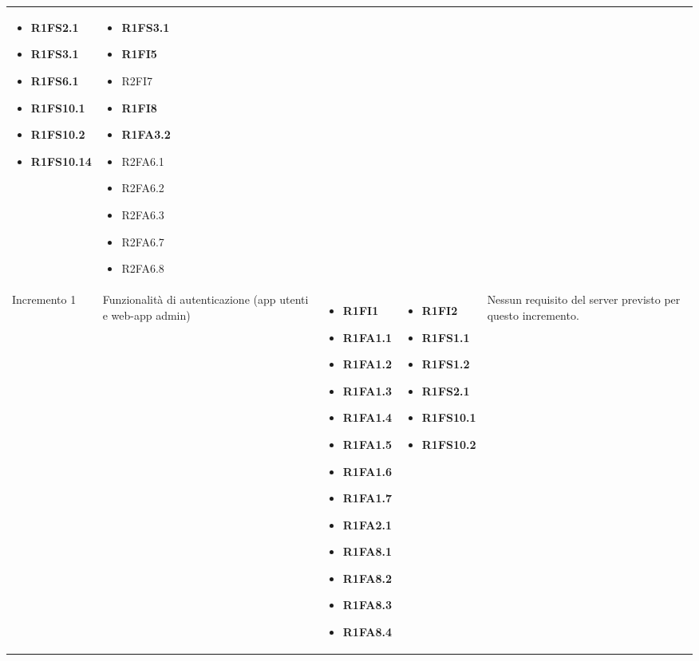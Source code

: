 {\begin{longtable}{C{2.5cm} C{3.2cm} C{2.8cm} C{2.8cm} C{2.8cm}}
\begin{itemize}
    \item[ ] \textbf{R1FS2.1}
    \item[ ] \textbf{R1FS3.1}
    \item[ ] \textbf{R1FS6.1}
    \item[ ] \textbf{R1FS10.1}
    \item[ ] \textbf{R1FS10.2} 
    \item[ ] \textbf{R1FS10.14}
\end{itemize} & \begin{itemize} 
    \item[ ] \textbf{R1FS3.1}
    \item[ ] \textbf{R1FI5}
    \item[ ] R2FI7
    \item[ ] \textbf{R1FI8}
    \item[ ] \textbf{R1FA3.2}
    \item[ ] R2FA6.1
    \item[ ] R2FA6.2
    \item[ ] R2FA6.3
    \item[ ] R2FA6.7
    \item[ ] R2FA6.8
\end{itemize}\\

Incremento 1 & Funzionalità di autenticazione (app utenti e web-app admin) & \begin{itemize}
    \item[ ] \textbf{R1FI1}
    \item[ ] \textbf{R1FA1.1}
    \item[ ] \textbf{R1FA1.2}
    \item[ ] \textbf{R1FA1.3}
    \item[ ] \textbf{R1FA1.4}
    \item[ ] \textbf{R1FA1.5}
    \item[ ] \textbf{R1FA1.6}
    \item[ ] \textbf{R1FA1.7}
    \item[ ] \textbf{R1FA2.1}
    \item[ ] \textbf{R1FA8.1}
    \item[ ] \textbf{R1FA8.2}
    \item[ ] \textbf{R1FA8.3}
    \item[ ] \textbf{R1FA8.4}
\end{itemize} & \begin{itemize} 
    \item[ ] \textbf{R1FI2}
    \item[ ] \textbf{R1FS1.1}
    \item[ ] \textbf{R1FS1.2}
    \item[ ] \textbf{R1FS2.1}
    \item[ ] \textbf{R1FS10.1}
    \item[ ] \textbf{R1FS10.2}
\end{itemize} & 
    Nessun requisito del server previsto per questo incremento. \\


\end{longtable}}
